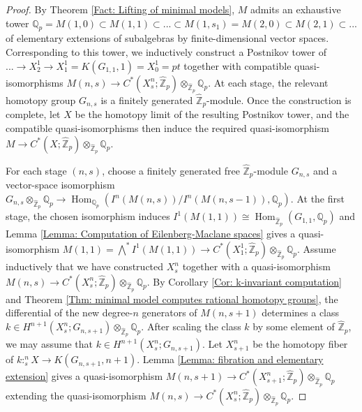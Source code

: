 \documentclass[11pt]{amsart}
\theoremstyle{definition}
\numberwithin{equation}{section}
\numberwithin{equation}{section}
\newcommand\QQ{\mathbb{Q}}
\newcommand\ZZ{\mathbb{Z}}
\DeclareMathOperator{\homo}{Hom}
\begin{document}
\begin{proof}
By Theorem \ref{Fact: Lifting of minimal models}, $M$ admits an exhaustive tower $\QQ_p=M(1,0)\subset M(1,1)\subset ...\subset M(1,s_1)=M(2,0)\subset M(2,1) \subset ...$ of elementary extensions of subalgebras by finite-dimensional vector spaces.
Corresponding to this tower, we inductively construct a Postnikov tower of $...\rightarrow X^1_2\rightarrow X^1_1=K(G_{1,1},1)=X^1_0=pt$ together with compatible quasi-isomorphisms $M(n,s)\rightarrow C^*(X^n_s;\widehat{\ZZ}_p)\otimes_{\widehat{\ZZ}_p} \QQ_p$. At each stage, the relevant homotopy group $G_{n,s}$ is a finitely generated $\widehat{\ZZ}_p$-module. Once the construction is complete, let $X$ be the homotopy limit of the resulting Postnikov tower, and the compatible quasi-isomorphisms then induce the required quasi-isomorphism $M\rightarrow C^*(X;\widehat{\ZZ}_p)\otimes_{\widehat{\ZZ}_p} \QQ_p$.

For each stage $(n,s)$, choose a finitely generated free $\widehat{\ZZ}_p$-module $G_{n,s}$ and a vector-space isomorphism $G_{n,s}\otimes_{\widehat{\ZZ}_p}\QQ_p\rightarrow \homo_{\QQ_p}(I^n(M(n,s))/I^n(M(n,s-1)),\QQ_p)$. At the first stage, the chosen isomorphism induces $I^1(M(1,1))\cong \homo_{\widehat{\ZZ}_p}(G_{1,1},\QQ_p)$ and Lemma \ref{Lemma: Computation of Eilenberg-Maclane spaces} gives a quasi-isomorphism $M(1,1)=\bigwedge^* I^1(M(1,1))\rightarrow C^*(X^1_1;\widehat{\ZZ}_p)\otimes_{\widehat{\ZZ}_p} \QQ_p$. Assume inductively that we have constructed $X^n_s$ together with a quasi-isomorphism $M(n,s)\rightarrow C^*(X^n_s;\widehat{\ZZ}_p)\otimes_{\widehat{\ZZ}_p} \QQ_p$. By Corollary \ref{Cor: k-invariant computation} and Theorem \ref{Thm: minimal model computes rational homotopy groups}, the differential of the new degree-$n$ generators of $M(n,s+1)$ determines a class $k\in H^{n+1}(X^n_s;G_{n,s+1})\otimes_{\widehat{\ZZ}_p} \QQ_p$. After scaling the class $k$ by some element of $\widehat{\ZZ}_p$, we may assume that $k\in H^{n+1}(X^n_s;G_{n,s+1})$. Let $X^{n}_{s+1}$ be the homotopy fiber of $k:^n_sX\rightarrow K(G_{n,s+1},n+1)$. Lemma \ref{Lemma: fibration and elementary extension} gives a quasi-isomorphism $M(n,s+1)\rightarrow C^*(X^{n}_{s+1};\widehat{\ZZ}_p)\otimes_{\widehat{\ZZ}_p} \QQ_p$ extending the quasi-isomorphism $M(n,s)\rightarrow C^*(X^{n}_s;\widehat{\ZZ}_p)\otimes_{\widehat{\ZZ}_p} \QQ_p$.
\end{proof}
\end{document}
